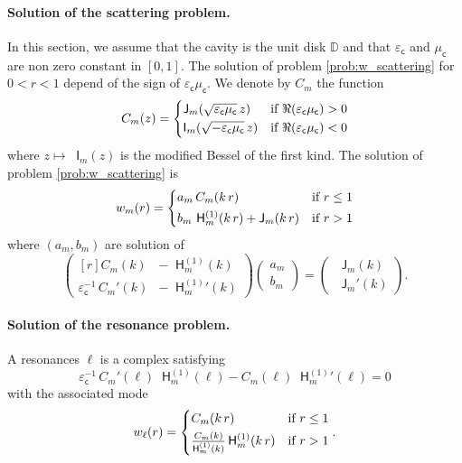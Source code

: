 \documentclass[12pt,a4paper]{article}
\newcommand{\bbD}{\mathbb{D}}
\newcommand{\bJ}{\mathop{}\!\mathsf{J}}
\newcommand{\Hu}{\mathop{}\!\mathsf{H}^{(1)}}
\newcommand{\bI}{\mathop{}\!\mathsf{I}}
\newcommand{\ecav}{\varepsilon_\mathsf{c}}
\newcommand{\mcav}{\mu_\mathsf{c}}
\begin{document}
\paragraph{Solution of the scattering problem.}
In this section, we assume that the cavity is the unit disk $\bbD$ and that $\ecav$ and $\mcav$ are non zero constant in $[0, 1]$.
The solution of problem \eqref{prob:w_scattering} for $0 < r < 1$ depend of the sign of $\ecav\mcav$.
We denote by $C_m$ the function
\[
    C_m(z) = \begin{dcases}
        \bJ_m(\sqrt{\ecav\mcav}\, z) & \text{if } \Re(\ecav\mcav) > 0\\
        \bI_m(\sqrt{-\ecav\mcav}\, z) & \text{if } \Re(\ecav\mcav) < 0
    \end{dcases}
\]
where $z \mapsto \bI_m(z)$ is the modified Bessel of the first kind.
The solution of problem \eqref{prob:w_scattering} is
\begin{equation}
    w_m(r) = \begin{dcases}
        a_m\, C_m(k\, r) & \text{if } r \le 1\\
        b_m\, \Hu_m(k\, r) + \bJ_m(k\, r) & \text{if } r > 1
    \end{dcases}
\end{equation}
where $(a_m, b_m)$ are solution of
\begin{equation}
    \begin{pmatrix*}[r]
        C_m(k) & -\Hu_m(k)\\[1ex]
        \ecav^{-1}\, C_m'(k) & -{\Hu_m}'(k)
    \end{pmatrix*}
    \begin{pmatrix}
        a_m\\[1ex]
        b_m
    \end{pmatrix} = 
    \begin{pmatrix}
        \bJ_m(k)\\[1ex]
        \bJ_m'(k)
    \end{pmatrix}.
\end{equation}


\paragraph{Solution of the resonance problem.}
A resonances $\ell$ is a complex satisfying
\begin{equation}
    \ecav^{-1}\, C_m'(\ell) \Hu_m(\ell) - C_m(\ell) {\Hu_m}'(\ell) = 0
\end{equation}
with the associated mode
\begin{equation}
    w_\ell(r) = \begin{dcases}
        C_m(k\, r) & \text{if } r \le 1\\
        \tfrac{C_m(k)}{\Hu_m(k)}\Hu_m(k\, r) & \text{if } r > 1
    \end{dcases}.
\end{equation}
\end{document}
